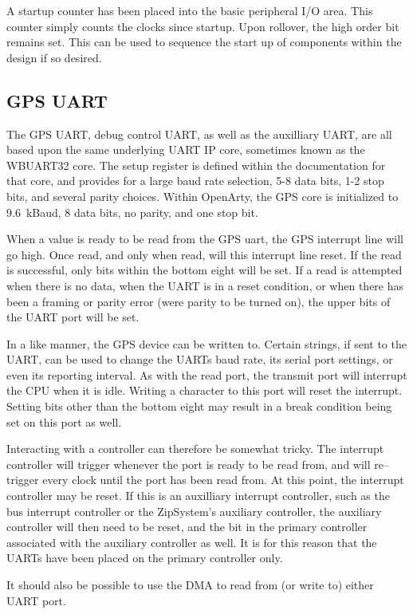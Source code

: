 \documentclass{gqtekspec}
\begin{document}
A startup counter has been placed into the basic peripheral I/O area.  This 
counter simply counts the clocks since startup.  Upon rollover, the high
order bit remains set.  This can be used to sequence the start up of components
within the design if so desired.

\subsection{GPS UART}
The GPS UART, debug control UART, as well as the auxilliary UART, are all
based upon the same underlying UART IP core, sometimes known as the WBUART32
core.  The setup register is defined within the documentation for that core,
and provides for a large baud rate selection, 5-8 data bits, 1-2 stop bits,
and several parity choices.  Within OpenArty, the GPS core is initialized
to 9.6~kBaud, 8 data bits, no parity, and one stop bit.  

When a value is ready to be read from the GPS uart, the GPS interrupt line
will go high.  Once read, and only when read, will this interrupt line reset.
If the read is successful, only bits within the bottom eight will be set.
If a read is attempted when there is no data, when the UART is in a reset
condition, or when there has been a framing or parity error (were parity
to be turned on), the upper bits of the UART port will be set.

In a like manner, the GPS device can be written to.  Certain strings, if sent
to the UART, can be used to change the UARTs baud rate, its serial port
settings, or even its reporting interval.  As with the read port, the transmit
port will interrupt the CPU when it is idle.  Writing a character to this
port will reset the interrupt.  Setting bits other than the bottom eight may
result in a break condition being set on this port as well.

Interacting with a controller can therefore be somewhat tricky.  The
interrupt controller will trigger whenever the port is ready to be read from,
and will re--trigger every clock until the port has been read from.  At this
point, the interrupt controller may be reset.  If this is an auxilliary
interrupt controller, such as the bus interrupt controller or the ZipSystem's
auxiliary controller, the auxiliary controller will then need to be reset,
and the bit in the primary controller associated with the auxiliary controller
as well.  It is for this reason that the UARTs have been placed on the
primary controller only.

It should also be possible to use the DMA to read from (or write to) either
UART port.
\end{document}
